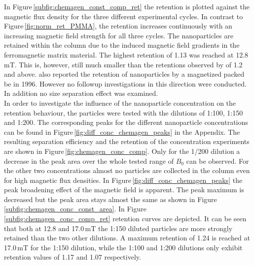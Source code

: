 In Figure\,\ref{subfig:chemagen_const_comp_ret} the retention is plotted against the magnetic flux density for the three different experimental cycles. In contrast to Figure\,\ref{fig:norm_ret_PMMA}, the retention increases continuously with an increasing magnetic field strength for all three cycles. The nanoparticles are retained within the column due to the induced magnetic field gradients in the ferromagnetic matrix material. The highest retention of 1.13 was reached at 12.8\,mT. This is, however, still much smaller than the retentions observed by \cite{AndreMaster} of 1.2 and above. \cite{nomizu1996magnetic} also reported the retention of nanoparticles by a magnetized packed be in 1996. However no followup investigations in this direction were conducted. In addition no size separation effect was examined. \\
In order to investigate the influence of the nanoparticle concentration on the retention behaviour, the particles were tested with the dilutions of 1:100, 1:150 and 1:200. The corresponding peaks for the different nanoparticle concentrations can be found in Figure\,\ref{fig:diff_conc_chemagen_peaks} in the Appendix. The resulting separation efficiency and the retention of the concentration experiments are shown in Figure\,\ref{fig:chemagen_conc_comp}. Only for the 1/200 dilution a decrease in the peak area over the whole tested range of $B_{0}$ can be observed. For the other two concentrations almost no particles are collected in the column even for high magnetic flux densities. In Figure\,\ref{fig:diff_conc_chemagen_peaks} the peak broadening effect of the magnetic field is apparent. The peak maximum is decreased but the peak area stays almost the same as shown in Figure\,\ref{subfig:chemagen_conc_const_area}. In Figure\,\ref{subfig:chemagen_conc_comp_ret} retention curves are depicted. It can be seen that both at 12.8 and 17.0\,mT the 1:150 diluted particles are more strongly retained than the two other dilutions. A maximum retention of 1.24 is reached at 17.0\,mT for the 1:150 dilution, while the 1:100 and 1:200 dilutions only exhibit retention values of 1.17 and 1.07 respectively. 

